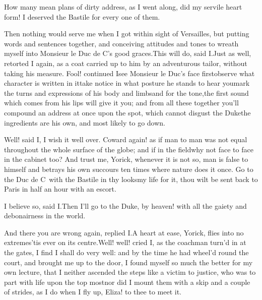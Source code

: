 \documentclass[twoside]{article}
\begin{document}
How many mean plans of dirty address, as I
went along, did my servile heart form!  I
deserved the Bastile for every one of
them.

Then nothing would serve me when I got
within sight of Versailles, but putting
words and sentences together, and
conceiving attitudes and tones to wreath
myself into Monsieur le Duc de C\astv’s
good graces.\tskk This will do, said
I.\tskk Just as well, retorted I again, as
a coat carried up to him by an adventurous
tailor, without taking his measure.  Fool!
continued I\tskk see Monsieur le Duc’s
face first\tskk observe what character is
written in it\tskk take notice in what
posture he stands to hear you\tskk mark
the turns and expressions of his body and
limbs\tskk and for the tone,\tskk the
first sound which comes from his lips will
give it you; and from all these together
you’ll compound an address at once upon
the spot, which cannot disgust the
Duke\tskk the ingredients are his own,
and most likely to go down.

Well! said I, I wish it well over.\tskk
Coward again! as if man to man was not
equal throughout the whole surface of the
globe; and if in the field\tskk why not
face to face in the cabinet too?  And
trust me, Yorick, whenever it is not so,
man is false to himself and betrays his
own succours ten times where nature does
it once.  Go to the Duc de C\anon\ with
the Bastile in thy looks\tskk my life for
it, thou wilt be sent back to Paris in
half an hour with an escort.

I believe so, said I.\tskk Then I’ll go to
the Duke, by heaven! with all the gaiety
and debonairness in the world.\tskk 

\tskk And there you are wrong again,
replied I.\tskk A heart at ease, Yorick,
flies into no extremes\tskk ’tis ever on
its centre.\tskk Well! well! cried I, as
the coachman turn’d in at the gates, I
find I shall do very well: and by the time
he had wheel’d round the court, and
brought me up to the door, I found myself
so much the better for my own lecture,
that I neither ascended the steps like a
victim to justice, who was to part with
life upon the top most\tskk nor did I
mount them with a skip and a couple of
strides, as I do when I fly up, Eliza! to
thee to meet it.
\end{document}
